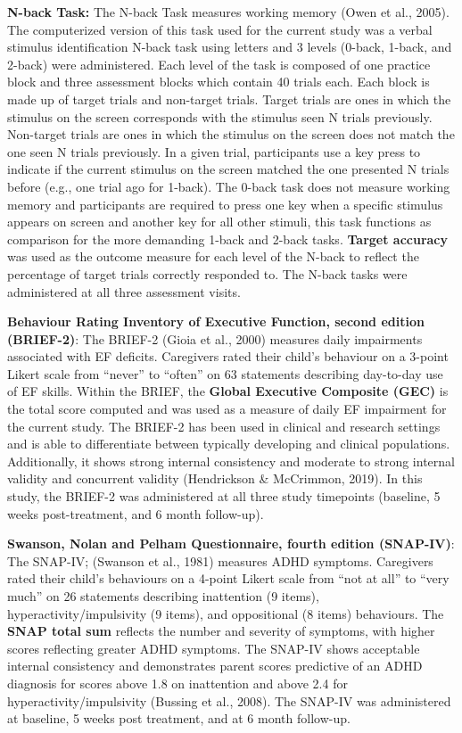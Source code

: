 \documentclass[
  letterpaper,
]{ut-thesis}
\begin{document}
\textbf{N-back Task:} The N-back Task measures working memory (Owen et
al., 2005). The computerized version of this task used for the current
study was a verbal stimulus identification N-back task using letters and
3 levels (0-back, 1-back, and 2-back) were administered. Each level of
the task is composed of one practice block and three assessment blocks
which contain 40 trials each. Each block is made up of target trials and
non-target trials. Target trials are ones in which the stimulus on the
screen corresponds with the stimulus seen N trials previously.
Non-target trials are ones in which the stimulus on the screen does not
match the one seen N trials previously. In a given trial, participants
use a key press to indicate if the current stimulus on the screen
matched the one presented N trials before (e.g., one trial ago for
1-back). The 0-back task does not measure working memory and
participants are required to press one key when a specific stimulus
appears on screen and another key for all other stimuli, this task
functions as comparison for the more demanding 1-back and 2-back tasks.
\textbf{Target accuracy} was used as the outcome measure for each level
of the N-back to reflect the percentage of target trials correctly
responded to. The N-back tasks were administered at all three assessment
visits.

\textbf{Behaviour Rating Inventory of Executive Function, second edition
(BRIEF-2)}: The BRIEF-2 (Gioia et al., 2000) measures daily impairments
associated with EF deficits. Caregivers rated their child's behaviour on
a 3-point Likert scale from ``never'' to ``often'' on 63 statements
describing day-to-day use of EF skills. Within the BRIEF, the
\textbf{Global Executive Composite (GEC)} is the total score computed
and was used as a measure of daily EF impairment for the current study.
The BRIEF-2 has been used in clinical and research settings and is able
to differentiate between typically developing and clinical populations.
Additionally, it shows strong internal consistency and moderate to
strong internal validity and concurrent validity (Hendrickson \&
McCrimmon, 2019). In this study, the BRIEF-2 was administered at all
three study timepoints (baseline, 5 weeks post-treatment, and 6 month
follow-up).

\textbf{Swanson, Nolan and Pelham Questionnaire, fourth edition
(SNAP-IV)}: The SNAP-IV; (Swanson et al., 1981) measures ADHD symptoms.
Caregivers rated their child's behaviours on a 4-point Likert scale from
``not at all'' to ``very much'' on 26 statements describing inattention
(9 items), hyperactivity/impulsivity (9 items), and oppositional (8
items) behaviours. The \textbf{SNAP total sum} reflects the number and
severity of symptoms, with higher scores reflecting greater ADHD
symptoms. The SNAP-IV shows acceptable internal consistency and
demonstrates parent scores predictive of an ADHD diagnosis for scores
above 1.8 on inattention and above 2.4 for hyperactivity/impulsivity
(Bussing et al., 2008). The SNAP-IV was administered at baseline, 5
weeks post treatment, and at 6 month follow-up.
\end{document}
